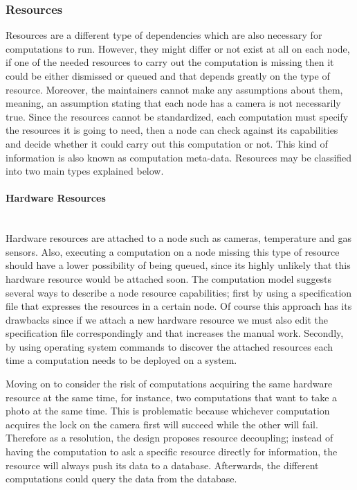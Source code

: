 \newpage
\subsubsection {Resources}



Resources are a different type of dependencies which are also necessary for computations to run. However, they might differ or not exist at all on each node, if one of the needed resources to carry out the computation is missing then it could be either dismissed or queued and that depends greatly on the type of resource. Moreover, the maintainers cannot make any assumptions about them, meaning, an assumption stating that each node has a camera is not necessarily true. Since the resources cannot be standardized, each computation must specify the resources it is going to need, then a node can check against its capabilities and decide whether it could carry out this computation or not. This kind of information is also known as computation meta-data. Resources may be classified into two main types explained below.

\paragraph{Hardware Resources}\mbox{}\\

  Hardware resources  are attached to a node such as cameras, temperature and gas sensors.  Also, executing a computation on a node missing this type of resource should have a lower possibility of being queued, since its highly unlikely that this hardware resource would be attached soon. The computation model suggests several ways to describe a node resource capabilities; first by using a specification file that expresses the resources in a certain node. Of course this approach has its drawbacks since if we attach a new hardware resource we must also edit the specification file correspondingly and that increases the manual work. Secondly, by using operating system commands to discover the attached resources each time a computation needs to be deployed on a system. 
  
  Moving on to consider the risk of computations acquiring the same hardware resource at the same time, for instance, two computations that want to take a photo at the same time. This is problematic because whichever computation acquires the lock on the camera first will succeed while the other will fail. Therefore as a resolution, the design proposes resource decoupling; instead of having the computation to ask a specific resource directly for information, the resource will always push its data to a database. Afterwards, the different computations could query the data from the database.
  

